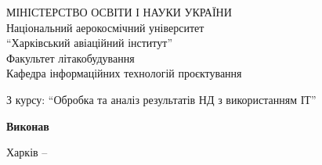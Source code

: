 \begin{titlepage}
    \begin{center}
        {\selectfont МІНІСТЕРСТВО ОСВІТИ І НАУКИ УКРАЇНИ} \\
        \vspace{0.5cm}
        Національний аерокосмічний університет
        \\ \enquote{Харківський авіаційний інститут}
        \vspace{0.5cm}
        \\ Факультет літакобудування
        \vspace{0.5cm}
        \\ Кафедра інформаційних технологій проєктування
    \end{center}
    \vspace{2.0cm}
    \begin{center}
        {\Large\textbf{\thetitle}\par}
        \vspace{0.5cm}
        \small{З курсу: \enquote{Обробка та аналіз результатів НД з використанням ІТ}\par}
    \end{center}
    \vspace{3.0cm}
    \hfill\parbox{7.0cm}{
        \begin{flushleft}
            \textbf{Виконав}\\
            \theauthor
        \end{flushleft}}
    \vfill

    \begin{center}
        Харків -- \thedate
    \end{center}
\end{titlepage}
